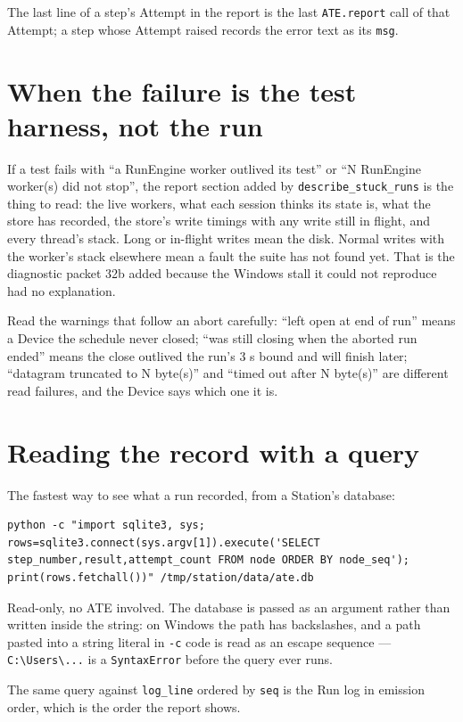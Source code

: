 The last line of a step's Attempt in the report is the last \texttt{ATE.report} call of that Attempt; a
step whose Attempt raised records the error text as its \texttt{msg}.

\section{When the failure is the test harness, not the run}

If a test fails with ``a RunEngine worker outlived its test'' or ``N RunEngine worker(s) did not stop'',
the report section added by \texttt{describe\_\allowbreak{}stuck\_\allowbreak{}runs} is the thing to read: the live workers, what each
session thinks its state is, what the store has recorded, the store's write timings with any write still in
flight, and every thread's stack. Long or in-flight writes mean the disk. Normal writes with the worker's
stack elsewhere mean a fault the suite has not found yet. That is the diagnostic packet 32b added because
the Windows stall it could not reproduce had no explanation.

Read the warnings that follow an abort carefully: ``left open at end of run'' means a Device the schedule
never closed; ``was still closing when the aborted run ended'' means the close outlived the run's 3 s bound
and will finish later; ``datagram truncated to N byte(s)'' and ``timed out after N byte(s)'' are different
read failures, and the Device says which one it is.

\section{Reading the record with a query}

The fastest way to see what a run recorded, from a Station's database:

\begin{lstlisting}[language=ATEShell]
python -c "import sqlite3, sys; rows=sqlite3.connect(sys.argv[1]).execute('SELECT step_number,result,attempt_count FROM node ORDER BY node_seq'); print(rows.fetchall())" /tmp/station/data/ate.db
\end{lstlisting}

Read-only, no ATE involved. The database is passed as an argument rather than written inside the
string: on Windows the path has backslashes, and a path pasted into a string literal in
\texttt{-c} code is read as an escape sequence --- \texttt{C:\textbackslash Users\textbackslash ...}
is a \texttt{SyntaxError} before the query ever runs.

The same query against \texttt{log\_line} ordered by \texttt{seq} is the Run log
in emission order, which is the order the report shows.

